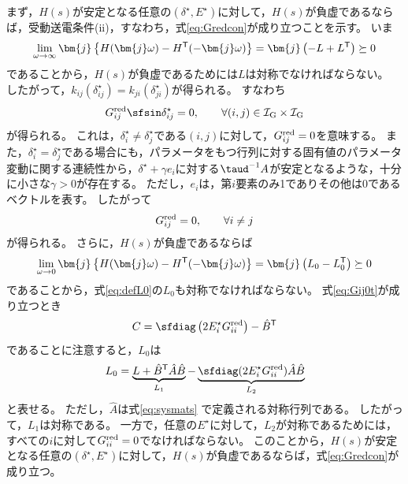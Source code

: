 \documentclass[tombow,dvipdfmx]{corona-a5-1.1}
\begin{document}
\begin{証明}
まず，$H(s)$が安定となる任意の$(\delta^{\star},E^{\star})$に対して，$H(s)$が負虚であるならば，受動送電条件(ii)，すなわち，式\ref{eq:Gredcon}が成り立つことを示す。
いま
\[
\lim_{\omega \rightarrow \infty} \bm{j}
\left\{
H(\bm{j}\omega)-H^{\sf T}(-\bm{j}\omega)
\right\}
=\bm{j}
\left(
-L+L^{\sf T}
\right) \succeq 0
\]
であることから，$H(s)$が負虚であるためには$L$は対称でなければならない。
したがって，$k_{ij}(\delta_{ij}^{\star}) = k_{ji}(\delta_{ji}^{\star})$が得られる。
すなわち
\[
G^{\rm red}_{ij} \sfsin \delta_{ij}^{\star} = 0 ,\qquad
\forall (i, j) \in \mathcal{I}_{\rm G} \times \mathcal{I}_{\rm G}
\]
が得られる。
これは，$\delta_{i}^{\star}\neq \delta_{j}^{\star}$である$(i,j)$に対して，$G^{\rm red}_{ij}=0$を意味する。
また，$\delta_{i}^{\star}= \delta_{j}^{\star}$である場合にも，パラメータをもつ行列に対する固有値のパラメータ変動に関する連続性から，$\delta^{\star}+\gamma e_i$に対する$\taud^{-1}A$が安定となるような，十分に小さな$\gamma>0$が存在する。
ただし，$e_i$は，第$i$要素のみ1でありその他は0であるベクトルを表す。
したがって
\begin{align}\label{eq:Gij0t}
G^{\rm red}_{ij}=0, \qquad
\forall i\neq j
\end{align}
が得られる。
さらに，$H(s)$が負虚であるならば
\[
\lim_{\omega \rightarrow 0} \bm{j}
\left\{
H(\bm{j}\omega)-H^{\sf T}(-\bm{j}\omega)
\right\}
=\bm{j}
\left(
L_0-L_0^{\sf T}
\right) \succeq 0
\]
であることから，式\ref{eq:defL0}の$L_0$も対称でなければならない。
式\ref{eq:Gij0t}が成り立つとき
\[
C = \sfdiag \left(
2E_i^{\star} G^{\rm red}_{ii}
\right)  - \hat{B}^{\sf T}
\]
であることに注意すると，$L_0$は
\[
L_0 = \underbrace{ L + \hat{B}^{\sf T} \hat{A} \hat{B} }_{L_1}
-
\underbrace{ \sfdiag (
2 E_i^{\star} G^{\rm red}_{ii}
) \hat{A} \hat{B}
}_{L_2}
\]
と表せる。
ただし，$\hat{A}$は式\ref{eq:sysmats}
で定義される対称行列である。
したがって，$L_1$は対称である。
一方で，任意の$E^{\star}$に対して，$L_2$が対称であるためには，すべての$i$に対して$G^{\rm red}_{ii}=0$でなければならない。
このことから，$H(s)$が安定となる任意の$(\delta^{\star},E^{\star})$に対して，$H(s)$が負虚であるならば，式\ref{eq:Gredcon}が成り立つ。



\end{証明}
\end{document}
